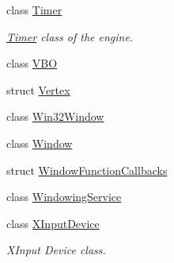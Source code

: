 \begin{DoxyCompactItemize}
class \hyperlink{class_blade_1_1_timer}{Timer}
\begin{DoxyCompactList}\small\item\em \hyperlink{class_blade_1_1_timer}{Timer} class of the engine. \end{DoxyCompactList}\item 
class \hyperlink{class_blade_1_1_v_b_o}{V\+BO}
\item 
struct \hyperlink{struct_blade_1_1_vertex}{Vertex}
\item 
class \hyperlink{class_blade_1_1_win32_window}{Win32\+Window}
\item 
class \hyperlink{class_blade_1_1_window}{Window}
\item 
struct \hyperlink{struct_blade_1_1_window_function_callbacks}{Window\+Function\+Callbacks}
\item 
class \hyperlink{class_blade_1_1_windowing_service}{Windowing\+Service}
\item 
class \hyperlink{class_blade_1_1_x_input_device}{X\+Input\+Device}
\begin{DoxyCompactList}\small\item\em X\+Input Device class. \end{DoxyCompactList}\end{DoxyCompactItemize}
